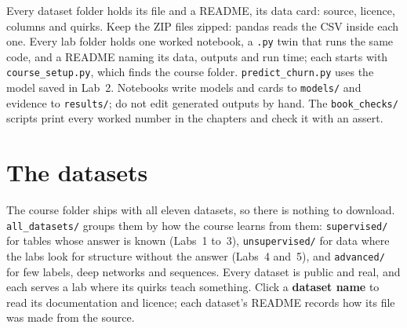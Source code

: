 {\footnotesize Every dataset folder holds its file and a README, its data card: source, licence, columns and quirks. Keep the ZIP files zipped: pandas reads the CSV inside each one. Every lab folder holds one worked notebook, a \texttt{.py} twin that runs the same code, and a README naming its data, outputs and run time; each starts with \texttt{course\_setup.py}, which finds the course folder. \texttt{predict\_churn.py} uses the model saved in Lab~2. Notebooks write models and cards to \texttt{models/} and evidence to \texttt{results/}; do not edit generated outputs by hand. The \texttt{book\_checks/} scripts print every worked number in the chapters and check it with an assert.\par}

\section{The datasets}

The course folder ships with all eleven datasets, so there is nothing to download. \texttt{all\_datasets/} groups them by how the course learns from them: \texttt{supervised/} for tables whose answer is known (Labs~1 to~3), \texttt{unsupervised/} for data where the labs look for structure without the answer (Labs~4 and~5), and \texttt{advanced/} for few labels, deep networks and sequences. Every dataset is public and real, and each serves a lab where its quirks teach something. Click a \textbf{dataset name} to read its documentation and licence; each dataset's README records how its file was made from the source.

